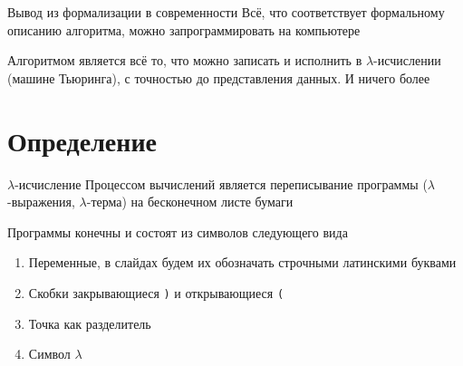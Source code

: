 \begin{frame}{Вывод из формализации в современности}
Всё, что соответствует формальному описанию алгоритма, можно запрограммировать на компьютере

\begin{definition}
Алгоритмом является всё то, что можно записать и исполнить в $\lambda$-исчислении (машине Тьюринга), с точностью до представления данных. И ничего более
\end{definition}

\end{frame}

\section{Определение}

\begin{frame}{$\lambda$-исчисление}
Процессом вычислений является переписывание программы ($\lambda$-выражения, $\lambda$-терма) на бесконечном листе бумаги

\vspace{1em}
Программы конечны и состоят из символов следующего вида
\begin{enumerate}
\item Переменные, в слайдах будем их обозначать строчными латинскими буквами
\item Скобки закрывающиеся \texttt{)} и открывающиеся \texttt{(}
\item Точка как разделитель
\item Символ $\lambda$
\end{enumerate}
\end{frame}


